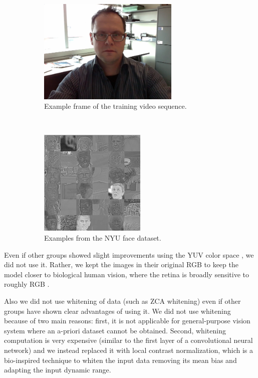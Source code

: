 \documentclass{article} %
\begin{document}
\begin{figure}
        \centering
        \begin{subfigure}[b]{0.5\textwidth}
                \centering
                \includegraphics[width=2.65in]{fig-examplevideo.png}
                \caption{Example frame of the training video sequence.}
        \end{subfigure}%
        ~%
        \begin{subfigure}[b]{0.5\textwidth}
                \centering
                \includegraphics[width=2in]{fig-faceds.png}
                \caption{Examples from the NYU face dataset.}
        \end{subfigure}
        \caption{}
\end{figure}

Even if other groups showed slight improvements using the YUV color space \cite{jarrett_what_2009}, we did not use it. Rather, we kept the images in their original RGB to keep the model closer to biological human vision, where the retina is broadly sensitive to roughly RGB \cite{wandell_foundations_1995}. 

Also we did not use whitening of data (such as ZCA whitening) even if other groups have shown clear advantages of using it.  We did not use whitening because of two main reasons: first, it is not applicable for general-purpose vision system where an a-priori dataset cannot be obtained. Second, whitening computation is very expensive (similar to the first layer of a convolutional neural network) and we instead replaced it with local contrast normalization, which is a bio-inspired technique to whiten the input data removing its mean bias and adapting the input dynamic range.
\end{document}
